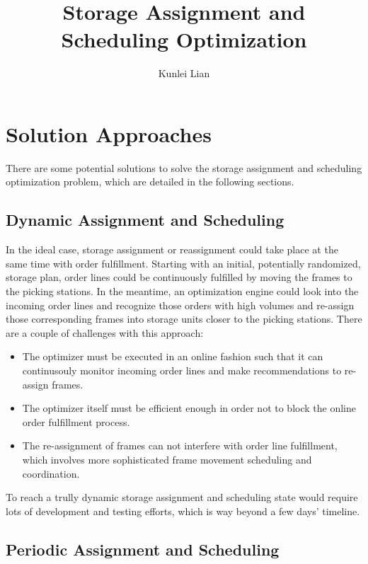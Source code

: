 \documentclass[a4, 11pt]{article}
\begin{document}
\title{\vspace{-4cm}Storage Assignment and Scheduling Optimization}
\author{Kunlei Lian}
\maketitle


\section{Solution Approaches}

There are some potential solutions to solve the storage assignment and scheduling optimization problem, which are detailed in the following sections.

\subsection{Dynamic Assignment and Scheduling}

In the ideal case, storage assignment or reassignment could take place at the same time with order fulfillment.
Starting with an initial, potentially randomized, storage plan, order lines could be continuously fulfilled by moving the frames to the picking stations.
In the meantime, an optimization engine could look into the incoming order lines and recognize those orders with high volumes and re-assign those corresponding frames into storage units closer to the picking stations.
There are a couple of challenges with this approach:

\begin{itemize}
	\item The optimizer must be executed in an online fashion such that it can continusouly monitor incoming order lines and make recommendations to re-assign frames.
	\item The optimizer itself must be efficient enough in order not to block the online order fulfillment process. 
	\item The re-assignment of frames can not interfere with order line fulfillment, which involves more sophisticated frame movement scheduling and coordination.
\end{itemize}

To reach a trully dynamic storage assignment and scheduling state would require lots of development and testing efforts, which is way beyond a few days' timeline.

\subsection{Periodic Assignment and Scheduling}
	
\end{document}
